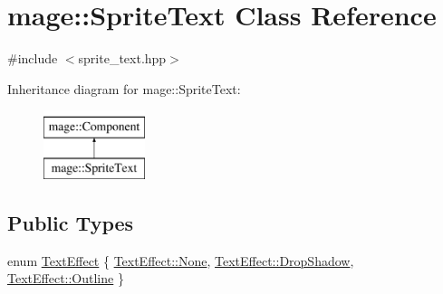 \hypertarget{classmage_1_1_sprite_text}{}\section{mage\+:\+:Sprite\+Text Class Reference}
\label{classmage_1_1_sprite_text}


{\ttfamily \#include $<$sprite\+\_\+text.\+hpp$>$}

Inheritance diagram for mage\+:\+:Sprite\+Text\+:\begin{figure}[H]
\begin{center}
\leavevmode
\includegraphics[height=2.000000cm]{classmage_1_1_sprite_text}
\end{center}
\end{figure}
\subsection*{Public Types}
\begin{DoxyCompactItemize}
\item 
enum \hyperlink{classmage_1_1_sprite_text_ac60331e941d1f76551b7bdfad6ee7324}{Text\+Effect} \{ \hyperlink{classmage_1_1_sprite_text_ac60331e941d1f76551b7bdfad6ee7324a6adf97f83acf6453d4a6a4b1070f3754}{Text\+Effect\+::\+None}, 
\hyperlink{classmage_1_1_sprite_text_ac60331e941d1f76551b7bdfad6ee7324a62fb0c043d7459d6590e00540884ea62}{Text\+Effect\+::\+Drop\+Shadow}, 
\hyperlink{classmage_1_1_sprite_text_ac60331e941d1f76551b7bdfad6ee7324a606b51cc1c9d0b4af394419a22f2ff1f}{Text\+Effect\+::\+Outline}
 \}
\end{DoxyCompactItemize}
